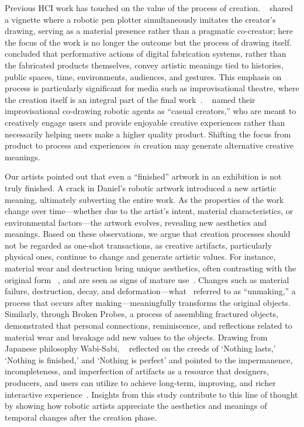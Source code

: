 Previous HCI work has touched on the value of the process of creation. ~\citet{bremers2024designing} shared a vignette where a robotic pen plotter simultaneously imitates the creator's drawing, serving as a material presence rather than a pragmatic co-creator; here the focus of the work is no longer the outcome but the process of drawing itself. ~\citet{devendorf2015reimagining} concluded that performative actions of digital fabrication systems, rather than the fabricated products themselves, convey artistic meanings tied to histories, public spaces, time, environments, audiences, and gestures. This emphasis on process is particularly significant for media such as improvisational theatre, where the creation itself is an integral part of the final work~\cite{o2011knowledge}. ~\citet{davis2016empirically} named their improvisational co-drawing robotic agents as ``casual creators,'' who are meant to creatively engage users and provide enjoyable creative experiences rather than necessarily helping users make a higher quality product. Shifting the focus from product to process and experiences \textit{in} creation may generate alternative creative meanings.

Our artists pointed out that even a ``finished'' artwork in an exhibition is not truly finished. A crack in Daniel's robotic artwork introduced a new artistic meaning, ultimately subverting the entire work. As the properties of the work change over time---whether due to the artist's intent, material characteristics, or environmental factors---the artwork evolves, revealing new aesthetics and meanings. %
Based on these observations, we argue that creation processes should not be regarded as one-shot transactions, as creative artifacts, particularly physical ones, continue to change and generate artistic values. For instance, material wear and destruction bring unique aesthetics, often contrasting with the original form ~\cite{zoran2013hybrid}, and are seen as signs of mature use~\cite{giaccardi2014growing}.
Changes such as material failure, destruction, decay, and deformation---what~\citet{song2021unmaking} referred to as ``unmaking,'' a process that occurs after making---meaningfully transforms the original objects. Similarly, through Broken Probes, a process of assembling fractured objects, ~\citet{ikemiya2014broken} demonstrated that personal connections, reminiscence, and reflections related to material wear and breakage add new values to the objects. Drawing from Japanese philosophy Wabi-Sabi, ~\citet{tsaknaki2016expanding} reflected on the creeds of `Nothing lasts,' `Nothing is finished,' and `Nothing is perfect' and pointed to the impermanence, incompleteness, and imperfection of artifacts as a resource that designers, producers, and users can utilize to achieve long-term, improving, and richer interactive experience~\cite{tsaknaki2016things}. Insights from this study contribute to this line of thought by showing how robotic artists appreciate the aesthetics and meanings of temporal changes after the creation phase.

